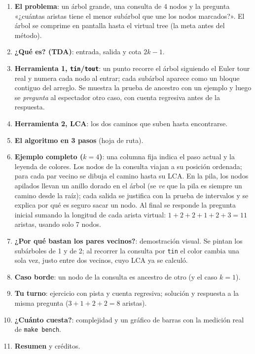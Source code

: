 \documentclass[11pt,a4paper]{article}
\theoremstyle{plain}
\begin{document}
\begin{enumerate}[label=\arabic*.]
  \item \textbf{El problema}: un árbol grande, una consulta de 4 nodos y la pregunta
        «¿cuántas aristas tiene el menor subárbol que une los nodos marcados?». El árbol se
        comprime en pantalla hasta el virtual tree (la meta antes del método).
  \item \textbf{¿Qué es? (TDA)}: entrada, salida y cota $2k-1$.
  \item \textbf{Herramienta 1, \texttt{tin}/\texttt{tout}}: un punto recorre el árbol siguiendo
        el Euler tour real y numera cada nodo al entrar; cada subárbol aparece como un bloque
        contiguo del arreglo. Se muestra la prueba de ancestro con un ejemplo y luego se
        \emph{pregunta} al espectador otro caso, con cuenta regresiva antes de la respuesta.
  \item \textbf{Herramienta 2, LCA}: los dos caminos que suben hasta encontrarse.
  \item \textbf{El algoritmo en 3 pasos} (hoja de ruta).
  \item \textbf{Ejemplo completo ($k=4$)}: una columna fija indica el paso actual y la leyenda
        de colores. Los nodos de la consulta viajan a su posición ordenada; para cada par vecino
        se dibuja el camino hasta su LCA. En la pila, los nodos apilados llevan un anillo dorado
        en el árbol (se \emph{ve} que la pila es siempre un camino desde la raíz); cada salida
        se justifica con la prueba de intervalos y se explica por qué es seguro sacar un nodo.
        Al final se responde la pregunta inicial sumando la longitud de cada arista virtual:
        $1+2+2+1+2+3 = 11$ aristas, usando solo 7 nodos.
  \item \textbf{¿Por qué bastan los pares vecinos?}: demostración visual. Se pintan los
        subárboles de 1 y de 2; al recorrer la consulta por \texttt{tin} el color cambia una
        sola vez, justo entre dos vecinos, cuyo LCA ya se calculó.
  \item \textbf{Caso borde}: un nodo de la consulta es ancestro de otro (y el caso $k=1$).
  \item \textbf{Tu turno}: ejercicio con pista y cuenta regresiva; solución y respuesta a la
        misma pregunta ($3+1+2+2 = 8$ aristas).
  \item \textbf{¿Cuánto cuesta?}: complejidad y un gráfico de barras con la medición real
        de \texttt{make bench}.
  \item \textbf{Resumen} y créditos.
\end{enumerate}
\end{document}
